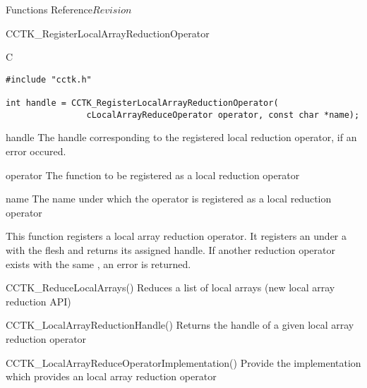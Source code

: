 \begin{cactuspart}{ Functions Reference}{}{$Revision$}
\begin{FunctionDescription}{CCTK\_RegisterLocalArrayReductionOperator}
\begin{SynopsisSection}
\begin{Synopsis}{C}
\begin{verbatim}
#include "cctk.h"

int handle = CCTK_RegisterLocalArrayReductionOperator(
                cLocalArrayReduceOperator operator, const char *name);
\end{verbatim}
\end{Synopsis}
\end{SynopsisSection}

\begin{ResultSection}
\begin{Result}{handle}
The handle corresponding to the registered local reduction operator, 
if an error occured.
\end{Result}
\end{ResultSection}

\begin{ParameterSection}
\begin{Parameter}{operator}
The function to be registered as a local reduction operator
\end{Parameter}
\begin{Parameter}{name}
The name under which the operator is registered as a local reduction operator
\end{Parameter}
\end{ParameterSection}

\begin{Discussion}
This function registers a local array reduction operator. It registers an 
under a  with the flesh and returns its assigned handle. If another reduction
operator exists with the same , an error is returned.
\end{Discussion}

\begin{SeeAlsoSection}
\begin{SeeAlso}{CCTK\_ReduceLocalArrays()}
Reduces a list of local arrays (new local array reduction API)
\end{SeeAlso}

\begin{SeeAlso}{CCTK\_LocalArrayReductionHandle()}
Returns the handle of a given local array reduction operator
\end{SeeAlso}

\begin{SeeAlso}{CCTK\_LocalArrayReduceOperatorImplementation()}
Provide the implementation which provides an local array reduction operator
\end{SeeAlso}


\end{SeeAlsoSection}
\end{FunctionDescription}
\end{cactuspart}

